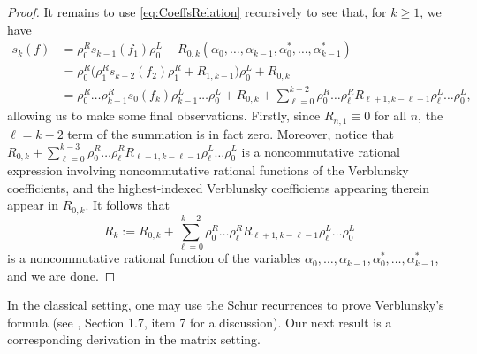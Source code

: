 \documentclass[11pt,reqno]{amsart}
\def\a{\alpha}
\def\r{\rho}
\theoremstyle{definition}
\numberwithin{equation}{section}
\begin{document}
\begin{proof}
    It remains to use \eqref{eq:CoeffsRelation} recursively to see that, for \(k \geq 1\), we have
    \begin{align*}
        s_k(f) & = \r_0^R s_{k-1}(f_{1}) \r_0^L + R_{0,k}(\a_0, \ldots, \a_{k-1}, \a_0^*, \ldots, \a_{k-1}^*) \\
        & = \r_0^R \bigg( \r_1^R s_{k-2}(f_2) \r_1^R + R_{1,k-1} \bigg) \r_0^L + R_{0,k} \\
        & = \r_0^R \ldots \r_{k-1}^R s_0(f_k) \r_{k-1}^L \ldots \r_0^L + R_{0,k} + \sum_{\ell=0}^{k-2} \r_0^R \ldots \r_{\ell}^R R_{\ell + 1, k - \ell - 1} \r_{\ell}^L \ldots \r_0^L,
    \end{align*}
    allowing us to make some final observations. Firstly, since \(R_{n,1} \equiv 0\) for all \(n\), the \(\ell = k-2\) term of the summation is in fact zero. Moreover, notice that \(R_{0,k} + \sum_{\ell=0}^{k-3} \r_0^R \ldots \r_{\ell}^R R_{\ell + 1, k - \ell - 1} \r_{\ell}^L \ldots \r_0^L\) is a noncommutative rational expression involving noncommutative rational functions of the Verblunsky coefficients, and the highest-indexed Verblunsky coefficients appearing therein appear in \(R_{0,k}\). It follows that
    \[
        R_k := R_{0,k} + \sum_{\ell=0}^{k-2} \r_0^R \ldots \r_{\ell}^R R_{\ell + 1, k - \ell - 1} \r_{\ell}^L \ldots \r_0^L
    \]
    is a noncommutative rational function of the variables \(\a_0, \ldots, \a_{k-1}, \a_0^*, \ldots, \a_{k-1}^*\), and we are done.
\end{proof}

In the classical setting, one may use the Schur recurrences to prove Verblunsky's formula (see \cite{Sim05a}, Section 1.7, item 7 for a discussion). Our next result is a corresponding derivation in the matrix setting.
\end{document}
